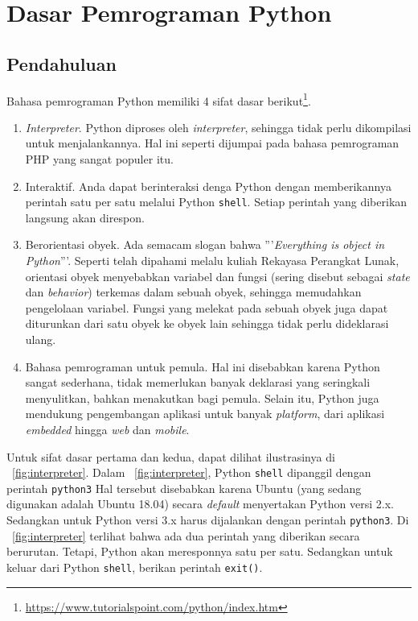\chapter{Dasar Pemrograman Python}
\section{Pendahuluan}
Bahasa pemrograman Python memiliki 4 sifat dasar berikut\footnote{\url{https://www.tutorialspoint.com/python/index.htm}}.
\begin{enumerate}
  \item \textit{Interpreter}. Python diproses oleh \textit{interpreter}, sehingga tidak perlu dikompilasi untuk menjalankannya. Hal ini seperti dijumpai pada bahasa pemrograman PHP yang sangat populer itu.
  \item Interaktif. Anda dapat berinteraksi denga Python dengan memberikannya perintah satu per satu melalui Python \texttt{shell}. Setiap perintah yang diberikan langsung akan direspon.
  \item Berorientasi obyek. Ada semacam slogan bahwa '''\textit{Everything is object in Python}'''. Seperti telah dipahami melalu kuliah Rekayasa Perangkat Lunak, orientasi obyek menyebabkan variabel dan fungsi (sering disebut sebagai \textit{state} dan \textit{behavior}) terkemas dalam sebuah obyek, sehingga memudahkan pengelolaan variabel. Fungsi yang melekat pada sebuah obyek juga dapat diturunkan dari satu obyek ke obyek lain sehingga tidak perlu dideklarasi ulang.
  \item Bahasa pemrograman untuk pemula. Hal ini disebabkan karena Python sangat sederhana, tidak memerlukan banyak deklarasi yang seringkali menyulitkan, bahkan menakutkan bagi pemula. Selain itu, Python juga mendukung pengembangan aplikasi untuk banyak \textit{platform}, dari aplikasi \textit{embedded} hingga \textit{web} dan \textit{mobile}. 
\end{enumerate}

Untuk sifat dasar pertama dan kedua, dapat dilihat ilustrasinya di \figurename~\ref{fig:interpreter}. Dalam \figurename~\ref{fig:interpreter}, Python \texttt{shell} dipanggil dengan perintah \texttt{python3} Hal tersebut disebabkan karena Ubuntu (yang sedang digunakan adalah Ubuntu 18.04) secara \textit{default} menyertakan Python versi 2.x. Sedangkan untuk Python versi 3.x harus dijalankan dengan perintah \texttt{python3}. Di \figurename~\ref{fig:interpreter} terlihat bahwa ada dua perintah yang diberikan secara berurutan. Tetapi, Python akan meresponnya satu per satu. Sedangkan untuk keluar dari Python \texttt{shell}, berikan perintah \texttt{exit()}.

